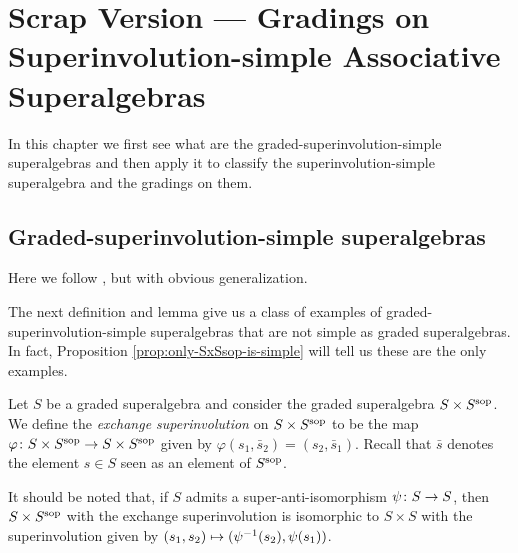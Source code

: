 \chapter{Scrap Version --- Gradings on Superinvolution-simple Associative Superalgebras}

In this chapter we first see what are the graded-superinvolution-simple superalgebras and then apply it to classify the superinvolution-simple superalgebra and the gradings on them.

\section{Graded-superinvolution-simple superalgebras}

Here we follow \cite{racine}, but with obvious generalization.



The next definition and lemma give us a class of examples of graded-superinvolution-simple superalgebras that are not simple as graded superalgebras.
In fact, Proposition \ref{prop:only-SxSsop-is-simple} will tell us these are the only examples.

\begin{defi}\label{def:SxSsop}
	Let $S$ be a graded superalgebra and consider the graded superalgebra $S \times S^{\mathrm{sop}}$.
	We define the \emph{exchange superinvolution} on $S \times S^{\mathrm{sop}}$ to be the map $\varphi\colon S \times S^{\mathrm{sop}} \to S \times S^{\mathrm{sop}}$ given by $\varphi (s_1, \bar s_2) = (s_2, \bar s_1)$. Recall that $\bar s$ denotes the element $s \in S$ seen as an element of $S^{\mathrm{sop}}$.
\end{defi}

It should be noted that, if $S$ admits a super-anti-isomorphism $\psi\colon S \to S$, then $S\times S^{\mathrm{sop}}$ with the exchange superinvolution is isomorphic to $S\times S$ with the superinvolution given by $(s_1, s_2) \mapsto (\psi^{-1} (s_2), \psi (s_1))$.


